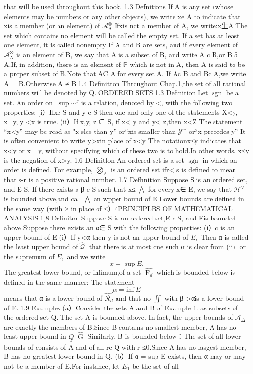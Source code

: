 that will be used throughout this book. 1.3 Defnitions If A is any set (whose elements may be numbers or any other objects), we write xe A to indicate that xis a member (or an element) of ${\mathcal{A}}_{\mathrm{A}}^{\otimes}$ Ifxis not a member of A, we write:x生A The set which contains no element will be called the empty set. If a set has at least one element, it is called nonempty If A and B are sets, and if every element of ${\mathcal{A}}_{\mathrm{A}}^{\otimes}$ is an element of B, we say that A is a subset of B, and write A c B,or B 5 A.If, in addition, there is an element of $\mathbb{P}$ which is not in A, then A is said to be a proper subset of B.Note that AC A for every set A. If Ac B and Bc A,we write A = B.Otherwise A ≠ B 1.4 Definitton Throughout Chap.1,the set of all rational numbers will be denoted by Q. ORDERED SETS 1.3 Definition Let $\operatorname{sgn}$ be a set. An order on $|\sup\sim^{\nu}$ is a relation, denoted by <, with the following two properties: (i）Ifxe S and y e S then one and only one of the statements X<y, x=y, y <x is true. (ii）If x,y, z ∈ S, if x< y and y< z,then x<Z The statement “x<y” may be read as "x sles than y” or“xis smaller than ${\mathcal{Y}}^{\sim}$ or“x precedes y” It is often convenient to write y>xin place of x<y The notationx≤y indicates that x<y or x= y, without specifying which of these two is to hold.In other words, x≤y is the negation of x>y. 1.6 Definitlon An ordered set is a set $\operatorname{sgn}$ in which an order is defined. For example, $\bigotimes_{\mathbb{Z}}$ is an ordered set ifr< s is defined to mean that s-r is a positive rational number. 1.7 Defhnition Suppose S is an ordered set, and E S. If there exists a β e S such that x≤ $\textstyle\bigwedge$ for every x∈ E, we say that ${\mathcal{H}}^{\vee}$ is bounded above,and call $\textstyle\bigwedge$ an wpper bound of E Lower bounds are defined in the same way (with ≥ in place of ≤）4PRINCIPLBS OF MATHEMATICAL ANALYSIS 1,8 Definiton Suppose S is an ordered set,E c S, and Eis bounded above Suppose there exists an α∈ S with the following properties: (i）c is an upper bound of E (i）If y<α then y is not an upper bound of $\textstyle{E},$ Then α is called the least upper bound of $\widehat{\mathcal{Q}}$ [that there is at most one such α is clear from (ii)] or the supremum of ${\bar{E}},$ and we write $$ x=\operatorname*{sup}E. $$ The greatest lower bound, or infimum,of a set ${\widehat{\operatorname{F}_{d}}}$ which is bounded below is defined in the same manner: The statement $$ \alpha=\mathrm{inf}\;E $$ means that α is a lower bound of ${\widehat{\mathcal{R}}}_{d}^{\nu}$ and that no $\textstyle\iint$ with β >αis a lower bound of E. 1.9 Examples (a）Consider the sets A and B of Example 1. as subsets of the ordered set Q. The set A is bounded above. In fact, the upper bounds of ${\mathcal{A}}_{\Delta}$ are exactly the members of B.Since B contains no smallest member, A has no least upper bound in $\underline{{{Q}}}$ ${\widehat{\operatorname{G}}}$ Similarly, B is bounded below：The set of all lower bounds of consists of A and of all re Q with r ≤0.Since A has no lasgest member, B has no greatest lower bound in Q. (b）If α = sup E exists, then α may or may not be a member of E.For instance, let $E_{1}$ be the set of all 